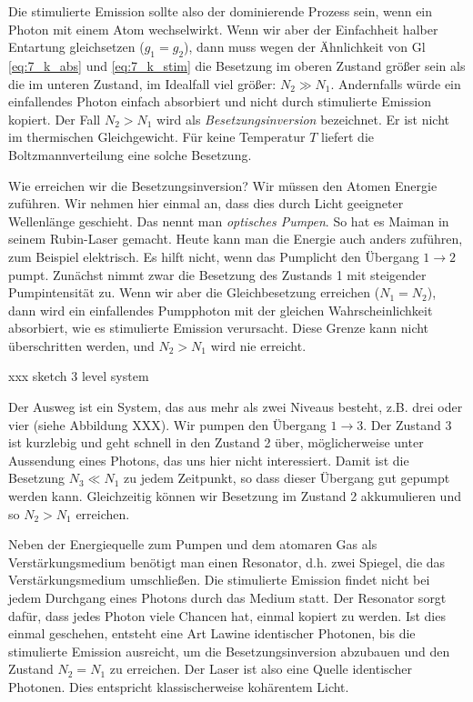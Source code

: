Die stimulierte Emission sollte also der dominierende Prozess sein, wenn ein Photon mit einem Atom wechselwirkt. Wenn wir aber der Einfachheit halber Entartung gleichsetzen ($g_1 = g_2$), dann muss wegen der Ähnlichkeit von Gl \ref{eq:7_k_abs} und \ref{eq:7_k_stim} die Besetzung im oberen Zustand größer sein als die im unteren Zustand, im Idealfall viel größer: $N_2 \gg N_1$. Andernfalls würde ein einfallendes Photon einfach absorbiert und nicht durch stimulierte Emission kopiert. Der Fall $N_2 > N_1$ wird als \emph{Besetzungsinversion} bezeichnet. Er ist nicht im thermischen Gleichgewicht. Für keine Temperatur $T$ liefert die Boltzmannverteilung eine solche Besetzung.

Wie erreichen wir die Besetzungsinversion? Wir müssen den Atomen Energie zuführen. Wir nehmen hier einmal an, dass dies durch Licht geeigneter Wellenlänge geschieht. Das nennt man \emph{optisches Pumpen}. So hat es Maiman in seinem Rubin-Laser gemacht. Heute kann man die Energie auch anders zuführen, zum Beispiel elektrisch. Es hilft nicht, wenn das Pumplicht den Übergang $1 \rightarrow 2$ pumpt. Zunächst nimmt zwar die Besetzung des Zustands 1 mit steigender Pumpintensität zu. Wenn wir aber die Gleichbesetzung erreichen ($N_1 = N_2$), dann wird ein einfallendes Pumpphoton mit der gleichen Wahrscheinlichkeit absorbiert, wie es stimulierte Emission verursacht. Diese Grenze kann nicht überschritten werden, und $N_2 > N_1$ wird nie erreicht.

xxx sketch 3 level system

Der Ausweg ist ein System, das aus mehr als zwei Niveaus besteht, z.B. drei oder vier (siehe Abbildung XXX). Wir pumpen den Übergang $1 \rightarrow 3$. Der Zustand 3 ist kurzlebig und geht schnell in den Zustand 2 über, möglicherweise unter Aussendung eines Photons, das uns hier nicht interessiert. Damit ist die Besetzung $N_3 \ll N_1$ zu jedem Zeitpunkt, so dass dieser Übergang gut gepumpt werden kann. Gleichzeitig können wir  Besetzung im Zustand 2 akkumulieren und so $N_2 > N_1$ erreichen.


Neben der Energiequelle zum Pumpen und dem atomaren Gas als Verstärkungsmedium benötigt man einen Resonator, d.h. zwei Spiegel, die das Verstärkungsmedium umschließen. Die stimulierte Emission findet nicht bei jedem Durchgang eines Photons durch das Medium statt.  Der Resonator sorgt dafür, dass jedes Photon viele Chancen hat, einmal kopiert zu werden. Ist dies einmal geschehen, entsteht eine Art Lawine identischer Photonen, bis die stimulierte Emission ausreicht, um die Besetzungsinversion abzubauen und den Zustand $N_2 = N_1$ zu erreichen. Der Laser ist also eine Quelle identischer Photonen. Dies entspricht klassischerweise kohärentem Licht.


